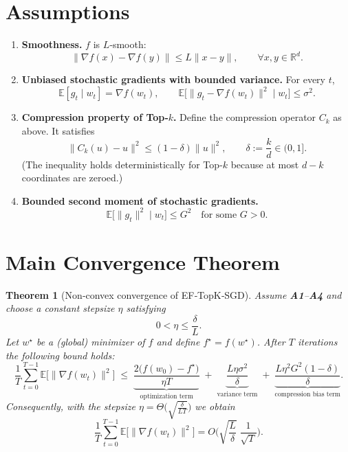 \documentclass{article}
\newtheorem{theorem}{Theorem}
\begin{document}
\section*{Assumptions}
\begin{enumerate}[label=\textbf{A\arabic*}]
    \item \textbf{Smoothness.} $f$ is $L$‑smooth:
          \[
          \|\nabla f(x)-\nabla f(y)\|\le L\|x-y\|,\qquad\forall x,y\in\mathbb{R}^{d}.
          \tag{A1}
          \]
    \item \textbf{Unbiased stochastic gradients with bounded variance.}
          For every $t$,
          \[
          \mathbb{E}[g_t\mid w_t]=\nabla f(w_t),\qquad
          \mathbb{E}\big[\|g_t-\nabla f(w_t)\|^{2}\mid w_t\big]\le\sigma^{2}. \tag{A2}
          \]
    \item \textbf{Compression property of Top‑$k$.}  
          Define the compression operator $C_k$ as above. It satisfies
          \[
          \|C_k(u)-u\|^{2}\le (1-\delta)\|u\|^{2},\qquad 
          \delta:=\frac{k}{d}\in(0,1]. \tag{A3}
          \]
          (The inequality holds deterministically for Top‑$k$ because at most $d-k$ coordinates are zeroed.)
    \item \textbf{Bounded second moment of stochastic gradients.}
          \[
          \mathbb{E}\big[\|g_t\|^{2}\mid w_t\big]\le G^{2}\quad\text{for some }G>0. \tag{A4}
          \]
\end{enumerate}

\section*{Main Convergence Theorem}
\begin{theorem}[Non‑convex convergence of EF‑TopK‑SGD]\label{thm:main}
Assume \textbf{A1}–\textbf{A4} and choose a constant stepsize $\eta$ satisfying 
\[
0<\eta\le \frac{\delta}{L}.
\]
Let $w^{\star}$ be a (global) minimizer of $f$ and define $f^{\star}=f(w^{\star})$.  
After $T$ iterations the following bound holds:
\[
\frac{1}{T}\sum_{t=0}^{T-1}\mathbb{E}\!\big[\|\nabla f(w_t)\|^{2}\big]
\;\le\;
\underbrace{\frac{2\big(f(w_0)-f^{\star}\big)}{\eta T}}_{\text{optimization term}}
\;+\;
\underbrace{\frac{L\eta\sigma^{2}}{\delta}}_{\text{variance term}}
\;+\;
\underbrace{\frac{L\eta^{2}G^{2}(1-\delta)}{\delta}}_{\text{compression bias term}}.
\tag{1}
\]
Consequently, with the stepsize $\eta = \Theta\!\big(\sqrt{\frac{\delta}{L T}}\big)$ we obtain
\[
\frac{1}{T}\sum_{t=0}^{T-1}\mathbb{E}\!\big[\|\nabla f(w_t)\|^{2}\big]
 = O\!\Big(\sqrt{\frac{L}{\delta}}\;\frac{1}{\sqrt{T}}\Big).
\]
\end{theorem}
\end{document}
